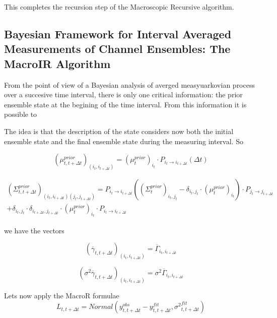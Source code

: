 \documentclass[pdflatex,sn-mathphys-num]{sn-jnl}%
\theoremstyle{thmstyleone}%
\theoremstyle{thmstyletwo}%
\theoremstyle{thmstylethree}%
\begin{document}
This completes the recursion step of the Macroscopic Recursive algorithm. 

\subsection{Bayesian Framework for Interval Averaged Measurements of Channel Ensembles: The MacroIR Algorithm}

From the point of view of a Bayesian analysis of averged measyuarkovian process over a succesive time interval, there is only one critical information: the prior ensemble state at the begining of the time interval. From this information it is possible to  


The idea is that the description of the state considers now both the initial ensemble state and the final ensemble state during the measuring interval. 
So 

\begin{equation}
	(\mu^{prior}_{t, t+ \Delta t})_{(i_t, i_{t+ \Delta t})} = (\mu^{prior}_{t})_{i_t}  \cdot P_{i_t \rightarrow i_{t+ \Delta t}}(\Delta t)
\end{equation}

\begin{multline}
	(\Sigma^{prior}_{t,t+ \Delta t})_{(i_t, i_{t+ \Delta t})(j_t, j_{t+ \Delta t})} =
	P_{i_t \rightarrow i_{t+ \Delta t}} \left((\Sigma^{prior}_{t})_{i_t ,j_t} - \delta_{i_t, j_t} \cdot (\mu^{prior}_t)_{i_t} \right)  \cdot P_{j_t \rightarrow j_{t+ \Delta t}} \\
	+ \delta_{i_t, j_t} \cdot \delta_{i_{t+ \Delta t}, j_{t+ \Delta t}} \cdot (\mu^{prior}_t)_{i_t}\cdot P_{i_t \rightarrow i_{t+ \Delta t}} 
\end{multline}

we have the vectors 

\begin{equation}
	({\overline \gamma}_{t,t+\Delta t })_{(i_t, i_{t+\Delta t})} = {\overline \Gamma}_{i_t,i_{t+\Delta t}}
\end{equation}

\begin{equation}
	(\sigma^2{\overline \gamma}_{t,t+\Delta t })_{(i_t, i_{t+\Delta t})} = \sigma^2{\overline \Gamma}_{i_t,i_{t+\Delta t}}
\end{equation}

Lets now apply the MacroR formulae
\begin{equation}
	L_{t, t+\Delta t}= Normal (y^{obs}_{t, t+\Delta t}-y^{fit}_{t, t+\Delta t}, {\sigma^{2}}^{fit}_{t, t+\Delta t})
\end{equation}
\end{document}
